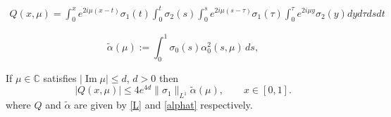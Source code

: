 \documentclass[10pt,a4paper]{amsart}
\renewcommand\Im{\operatorname{Im}}
\begin{document}
\begin{align}\label{L}
Q(x,\mu) = \int_0^xe^{2i \mu (x-t)}\sigma_1(t)\int_0^t\sigma_2(s)\int_0^se^{2i\mu(s-\tau)}\sigma_1(\tau)\int_0^{\tau} e^{2i \mu y}\sigma_2(y) dy d\tau ds dt
\end{align}

\begin{equation}\label{alphat}
\widetilde{\alpha}(\mu):=\int_0^1 \sigma_0(s)\alpha_0^2(s,\mu)\,ds,
\end{equation}

\begin{prop}\label{int4}
If $\mu \in \mathbb C$ satisfies $|\Im \mu|\le d$, $d>0$
then
\begin{equation}\label{A}
|Q(x,\mu)|\le 4 e^{4d}\|\sigma_1\|_{L^1}\widetilde{\alpha}(\mu),\qquad x \in [0,1].
\end{equation}
where $Q$ and $\tilde{\alpha}$ are given by \eqref{L} and \eqref{alphat} respectively.
\end{prop}
\end{document}
